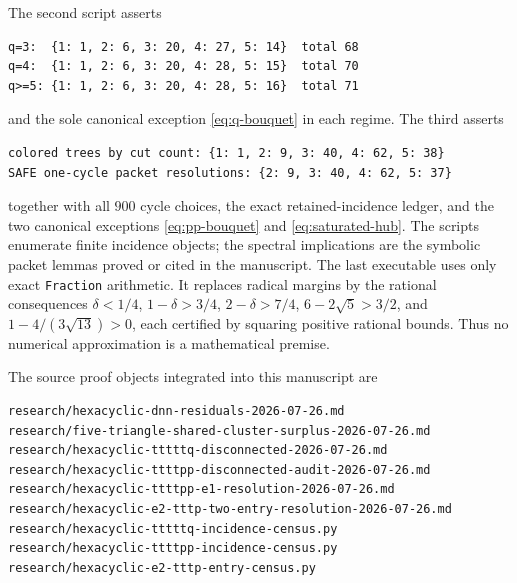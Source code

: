\documentclass[11pt]{article}
\begin{document}
The second script asserts
\begin{verbatim}
q=3:  {1: 1, 2: 6, 3: 20, 4: 27, 5: 14}  total 68
q=4:  {1: 1, 2: 6, 3: 20, 4: 28, 5: 15}  total 70
q>=5: {1: 1, 2: 6, 3: 20, 4: 28, 5: 16}  total 71
\end{verbatim}
and the sole canonical exception \eqref{eq:q-bouquet} in each regime.  The
third asserts
\begin{verbatim}
colored trees by cut count: {1: 1, 2: 9, 3: 40, 4: 62, 5: 38}
SAFE one-cycle packet resolutions: {2: 9, 3: 40, 4: 62, 5: 37}
\end{verbatim}
together with all $900$ cycle choices, the exact retained-incidence ledger,
and the two canonical exceptions \eqref{eq:pp-bouquet} and
\eqref{eq:saturated-hub}.  The scripts enumerate finite incidence objects;
the spectral implications are the symbolic packet lemmas proved or cited in
the manuscript.  The last executable uses only exact \texttt{Fraction}
arithmetic.  It replaces radical margins by the rational consequences
$\delta<1/4$, $1-\delta>3/4$, $2-\delta>7/4$,
$6-2\sqrt5>3/2$, and $1-4/(3\sqrt{13})>0$, each certified by squaring positive
rational bounds.  Thus no numerical approximation is a mathematical premise.

The source proof objects integrated into this manuscript are
\begin{verbatim}
research/hexacyclic-dnn-residuals-2026-07-26.md
research/five-triangle-shared-cluster-surplus-2026-07-26.md
research/hexacyclic-tttttq-disconnected-2026-07-26.md
research/hexacyclic-ttttpp-disconnected-audit-2026-07-26.md
research/hexacyclic-ttttpp-e1-resolution-2026-07-26.md
research/hexacyclic-e2-tttp-two-entry-resolution-2026-07-26.md
research/hexacyclic-tttttq-incidence-census.py
research/hexacyclic-ttttpp-incidence-census.py
research/hexacyclic-e2-tttp-entry-census.py
\end{verbatim}
\end{document}
